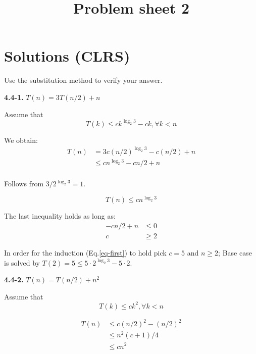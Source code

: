 \documentclass[11pt,a4paper]{article}
\title{Problem sheet 2}
\date{}
\renewcommand{\leq}{\leqslant}
\renewcommand{\geq}{\geqslant}
\begin{document}
\maketitle

\section*{Solutions (CLRS)}
Use the substitution method to verify your answer.


\noindent\textbf{4.4-1.} $T(n) = 3T(n / 2) + n$

Assume that
\begin{equation}
\label{eq-first}
T(k) \leq ck^{\log_2 3} -ck, \forall k < n
\end{equation}

We obtain:
\begin{equation*}
\begin{split}
T(n) & = 3c(n/2)^{\log_2 3} - c(n/2) + n \\
	 & \leq cn^{\log_2 3} - cn / 2 + n \\
\end{split}
\end{equation*}

Follows from $3/2^{\log_2 3} = 1$.

\begin{equation*}
	T(n) \leq cn^{\log_2 3}
\end{equation*}

The last inequality holds as long as:
\begin{align*}
	-cn/2 + n & \leq 0 \\
	c & \geq 2
\end{align*}
\break

In order for the induction (Eq.\ref{eq-first}) to hold pick $c = 5$ and $n \geq 2$; Base case is solved by $T(2) = 5 \leq 5 \cdot 2^{\log_2 3} - 5\cdot2$.


\noindent\textbf{4.4-2.} $T(n) = T(n / 2) + n^2$

Assume that
\begin{equation}
\label{eq-second}
T(k) \leq ck^2, \forall k < n
\end{equation}

\begin{equation}
\label{eq-v1}
\begin{split}
T(n) & \leq c(n/2)^{2} - (n/2)^2 \\
	 & \leq n^2(c+1)/4 \\
	 & \leq cn^2
\end{split}
\end{equation}
\end{document}
